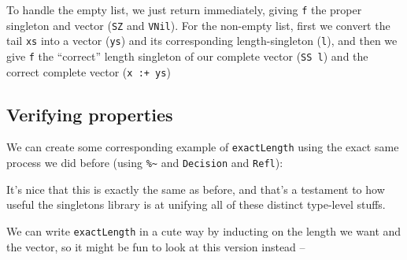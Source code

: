 \documentclass[]{article}
\newenvironment{Shaded}{}{}
\newcommand{\KeywordTok}[1]{\textcolor[rgb]{0.00,0.44,0.13}{\textbf{#1}}}
\newcommand{\DataTypeTok}[1]{\textcolor[rgb]{0.56,0.13,0.00}{#1}}
\newcommand{\CommentTok}[1]{\textcolor[rgb]{0.38,0.63,0.69}{\textit{#1}}}
\newcommand{\OtherTok}[1]{\textcolor[rgb]{0.00,0.44,0.13}{#1}}
\newcommand{\FunctionTok}[1]{\textcolor[rgb]{0.02,0.16,0.49}{#1}}
\newcommand{\NormalTok}[1]{#1}
\begin{document}
To handle the empty list, we just return immediately, giving \texttt{f} the
proper singleton and vector (\texttt{SZ} and \texttt{VNil}). For the non-empty
list, first we convert the tail \texttt{xs} into a vector (\texttt{ys}) and its
corresponding length-singleton (\texttt{l}), and then we give \texttt{f} the
``correct'' length singleton of our complete vector (\texttt{SS\ l}) and the
correct complete vector (\texttt{x\ :+\ ys})

\subsection{Verifying properties}\label{verifying-properties-1}

We can create some corresponding example of \texttt{exactLength} using the exact
same process we did before (using \texttt{\%\textasciitilde{}} and
\texttt{Decision} and \texttt{Refl}):

\begin{Shaded}
\end{Shaded}

It's nice that this is exactly the same as before, and that's a testament to how
useful the singletons library is at unifying all of these distinct type-level
stuffs.

We can write \texttt{exactLength} in a cute way by inducting on the length we
want and the vector, so it might be fun to look at this version instead --
\end{document}
